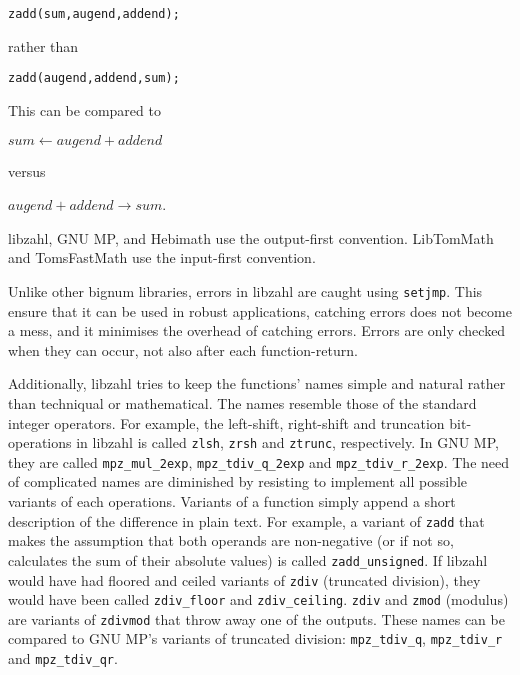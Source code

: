 \begin{alltt}
   zadd(sum, augend, addend);
\end{alltt}

\noindent
rather than

\begin{alltt}
   zadd(augend, addend, sum);
\end{alltt}

\noindent
This can be compared to

\vspace{1ex}
$sum \gets augend + addend$
\vspace{1ex}

\noindent
versus

\vspace{1ex}
$augend + addend \rightarrow sum$.
\vspace{1ex}

libzahl, GNU MP, and Hebimath use the output-first
convention. LibTomMath and TomsFastMath use the
input-first convention.

Unlike other bignum libraries, errors in libzahl are
caught using {\tt setjmp}. This ensure that it can be
used in robust applications, catching errors does not
become a mess, and it minimises the overhead of
catching errors. Errors are only checked when they can
occur, not also after each function-return.

Additionally, libzahl tries to keep the functions'
names simple and natural rather than techniqual or
mathematical. The names resemble those of the standard
integer operators. For example, the left-shift, right-shift
and truncation bit-operations in libzahl is called
{\tt zlsh}, {\tt zrsh} and {\tt ztrunc}, respectively.
In GNU MP, they are called {\tt mpz\_mul\_2exp},
{\tt mpz\_tdiv\_q\_2exp} and {\tt mpz\_tdiv\_r\_2exp}.
The need of complicated names are diminished by resisting
to implement all possible variants of each operations.
Variants of a function simply append a short description
of the difference in plain text. For example, a variant of
{\tt zadd} that makes the assumption that both operands
are non-negative (or if not so, calculates the sum of
their absolute values) is called {\tt zadd\_unsigned}.
If libzahl would have had floored and ceiled variants of
{\tt zdiv} (truncated division), they would have been
called {\tt zdiv\_floor} and {\tt zdiv\_ceiling}.
{\tt zdiv} and {\tt zmod} (modulus) are variants of
{\tt zdivmod} that throw away one of the outputs. These
names can be compared to GNU MP's variants of truncated
division: {\tt mpz\_tdiv\_q}, {\tt mpz\_tdiv\_r} and
{\tt mpz\_tdiv\_qr}.


